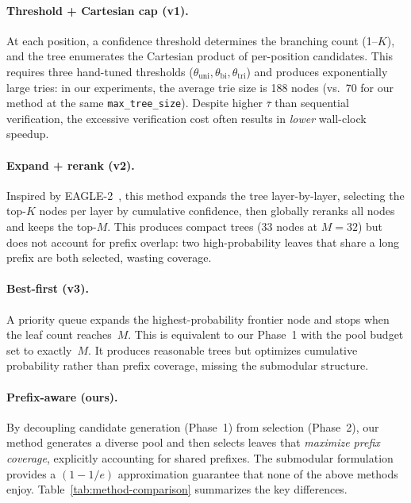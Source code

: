 \paragraph{Threshold + Cartesian cap (v1).}
At each position, a confidence threshold determines the branching
count (1--$K$), and the tree enumerates the Cartesian product of
per-position candidates.  This requires three hand-tuned thresholds
($\theta_{\text{uni}}, \theta_{\text{bi}}, \theta_{\text{tri}}$) and
produces exponentially large tries: in our experiments, the average
trie size is 188 nodes (vs.\ 70 for our method at the same
\texttt{max\_tree\_size}).  Despite higher $\bar{\tau}$ than sequential
verification, the excessive verification cost often results in
\emph{lower} wall-clock speedup.

\paragraph{Expand + rerank (v2).}
Inspired by EAGLE-2~\citep{li2024eagle2}, this method expands the
tree layer-by-layer, selecting the top-$K$ nodes per layer by
cumulative confidence, then globally reranks all nodes and keeps the
top-$M$.  This produces compact trees (33 nodes at $M{=}32$) but does
not account for prefix overlap: two high-probability leaves that share
a long prefix are both selected, wasting coverage.

\paragraph{Best-first (v3).}
A priority queue expands the highest-probability frontier node and
stops when the leaf count reaches~$M$.  This is equivalent to our
Phase~1 with the pool budget set to exactly~$M$.  It produces
reasonable trees but optimizes cumulative probability rather than
prefix coverage, missing the submodular structure.

\paragraph{Prefix-aware (ours).}
By decoupling candidate generation (Phase~1) from selection
(Phase~2), our method generates a diverse pool and then selects
leaves that \emph{maximize prefix coverage}, explicitly accounting for
shared prefixes.  The submodular formulation provides a
$(1 - 1/e)$ approximation guarantee that none of the above methods
enjoy.  Table~\ref{tab:method-comparison} summarizes the key
differences.

